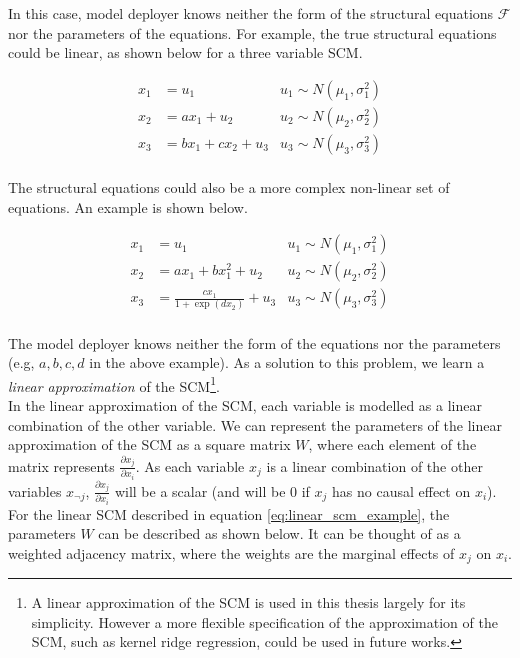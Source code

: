 In this case, model deployer knows neither the form of the structural equations $\mathcal{F}$ nor the parameters of the equations. For example, the true structural equations could be linear, as shown below for a three variable SCM.

\begin{align} \label{eq:linear_scm_example}
	x_1 & = u_1 & u_1 \sim N(\mu_1,\sigma_1^2) \\ \nonumber
	x_2 & = ax_1 + u_2 & u_2 \sim N(\mu_2,\sigma_2^2) \\ \nonumber
	x_3 & = bx_1 + cx_2 + u_3 & u_3 \sim N(\mu_3,\sigma_3^2) \\ \nonumber
\end{align}

The structural equations could also be a more complex non-linear set of equations. An example is shown below.

\begin{align}
	x_1 & = u_1 & u_1 \sim N(\mu_1,\sigma_1^2) \\ \nonumber
	x_2 & = ax_1 + bx_1^2 + u_2 & u_2 \sim N(\mu_2,\sigma_2^2) \\ \nonumber
	x_3 & = \frac{cx_1}{1 + \exp(dx_2)} + u_3 & u_3 \sim N(\mu_3,\sigma_3^2) \\ \nonumber
\end{align}

The model deployer knows neither the form of the equations nor the parameters (e.g, $a,b,c,d$ in the above example). As a solution to this problem, we learn a \textit{linear approximation} of the SCM\footnote{A linear approximation of the SCM is used in this thesis largely for its simplicity. However a more flexible specification of the approximation of the SCM, such as kernel ridge regression, could be used in future works.}.\\

In the linear approximation of the SCM, each variable is modelled as a linear combination of the other variable. We can represent the parameters of the linear approximation of the SCM as a square matrix $W$, where each element of the matrix represents $\frac{\partial x_j}{\partial x_i}$. As each variable $x_j$ is a linear combination of the other variables $x_{\neg j}$, $\frac{\partial x_j}{\partial x_i}$ will be a scalar (and will be 0 if $x_j$ has no causal effect on $x_i$). For the linear SCM described in equation \ref{eq:linear_scm_example}, the parameters $W$ can be described as shown below. It can be thought of as a weighted adjacency matrix, where the weights are the marginal effects of $x_j$ on $x_i$.

